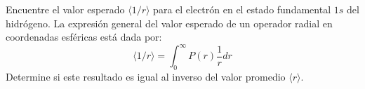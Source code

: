\item Encuentre el valor esperado $\langle 1/r \rangle$ para el electrón en el estado fundamental $1s$ del hidrógeno. La expresión general del valor esperado de un operador radial en coordenadas esféricas está dada por:
$$ \langle 1/r \rangle = \int_0^{\infty} P(r) \frac{1}{r} dr $$
Determine si este resultado es igual al inverso del valor promedio $\langle r \rangle$.